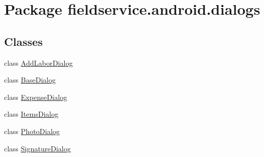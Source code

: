 \hypertarget{namespacefieldservice_1_1android_1_1dialogs}{\section{Package fieldservice.\+android.\+dialogs}
\label{namespacefieldservice_1_1android_1_1dialogs}
}
\subsection*{Classes}
\begin{DoxyCompactItemize}
\item 
class \hyperlink{classfieldservice_1_1android_1_1dialogs_1_1_add_labor_dialog}{Add\+Labor\+Dialog}
\item 
class \hyperlink{classfieldservice_1_1android_1_1dialogs_1_1_base_dialog}{Base\+Dialog}
\item 
class \hyperlink{classfieldservice_1_1android_1_1dialogs_1_1_expense_dialog}{Expense\+Dialog}
\item 
class \hyperlink{classfieldservice_1_1android_1_1dialogs_1_1_items_dialog}{Items\+Dialog}
\item 
class \hyperlink{classfieldservice_1_1android_1_1dialogs_1_1_photo_dialog}{Photo\+Dialog}
\item 
class \hyperlink{classfieldservice_1_1android_1_1dialogs_1_1_signature_dialog}{Signature\+Dialog}
\end{DoxyCompactItemize}
